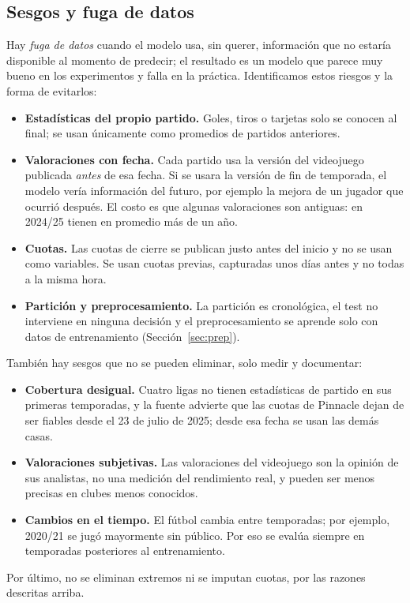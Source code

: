 \documentclass[conference]{IEEEtran}
\begin{document}
\subsection{Sesgos y fuga de datos}
Hay \emph{fuga de datos} cuando el modelo usa, sin querer, información que no estaría disponible al momento de predecir; el resultado es un modelo que parece muy bueno en los experimentos y falla en la práctica. Identificamos estos riesgos y la forma de evitarlos:
\begin{itemize}
\item \textbf{Estadísticas del propio partido.} Goles, tiros o tarjetas solo se conocen al final; se usan únicamente como promedios de partidos anteriores.
\item \textbf{Valoraciones con fecha.} Cada partido usa la versión del videojuego publicada \emph{antes} de esa fecha. Si se usara la versión de fin de temporada, el modelo vería información del futuro, por ejemplo la mejora de un jugador que ocurrió después. El costo es que algunas valoraciones son antiguas: en 2024/25 tienen en promedio más de un año.
\item \textbf{Cuotas.} Las cuotas de cierre se publican justo antes del inicio y no se usan como variables. Se usan cuotas previas, capturadas unos días antes y no todas a la misma hora.
\item \textbf{Partición y preprocesamiento.} La partición es cronológica, el test no interviene en ninguna decisión y el preprocesamiento se aprende solo con datos de entrenamiento (Sección~\ref{sec:prep}).
\end{itemize}
También hay sesgos que no se pueden eliminar, solo medir y documentar:
\begin{itemize}
\item \textbf{Cobertura desigual.} Cuatro ligas no tienen estadísticas de partido en sus primeras temporadas, y la fuente advierte que las cuotas de Pinnacle dejan de ser fiables desde el 23 de julio de 2025; desde esa fecha se usan las demás casas.
\item \textbf{Valoraciones subjetivas.} Las valoraciones del videojuego son la opinión de sus analistas, no una medición del rendimiento real, y pueden ser menos precisas en clubes menos conocidos.
\item \textbf{Cambios en el tiempo.} El fútbol cambia entre temporadas; por ejemplo, 2020/21 se jugó mayormente sin público. Por eso se evalúa siempre en temporadas posteriores al entrenamiento.
\end{itemize}
Por último, no se eliminan extremos ni se imputan cuotas, por las razones descritas arriba.
\end{document}
